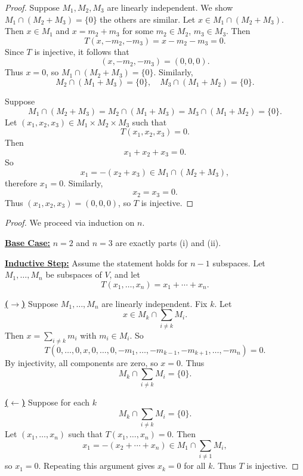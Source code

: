 \begin{proof}
\underbar{\textbf{($\longrightarrow$)}} 
    Suppose $M_1, M_2, M_3$ are linearly independent.
    We show $M_1 \cap (M_2 + M_3)=\{0\}$ the others are similar.
    Let $x \in M_1 \cap (M_2 + M_3)$. Then $x \in M_1$ and $x = m_2 + m_3$ for some $m_2 \in M_2$, $m_3 \in M_3$.
    Then
    \[
    T(x, -m_2, -m_3) = x - m_2 - m_3 = 0.
    \]
    Since $T$ is injective, it follows that
    \[
    (x, -m_2, -m_3) = (0,0,0).
    \]
    Thus $x=0$, so $M_1 \cap (M_2 + M_3)=\{0\}$.
    Similarly,
    \[
    M_2 \cap (M_1 + M_3)=\{0\}, \quad
    M_3 \cap (M_1 + M_2)=\{0\}.
    \]

    \underbar{\textbf{($\longleftarrow$)}} 
    Suppose
    \[
    M_1 \cap (M_2 + M_3)
    =
    M_2 \cap (M_1 + M_3)
    =
    M_3 \cap (M_1 + M_2)
    =
    \{0\}.
    \]
    Let $(x_1,x_2,x_3) \in M_1 \times M_2 \times M_3$ such that
    \[
    T(x_1,x_2,x_3)=0.
    \]
    Then
    \[
    x_1 + x_2 + x_3 = 0.
    \]
    So
    \[
    x_1 = -(x_2 + x_3) \in M_1 \cap (M_2 + M_3),
    \]
    therefore $x_1=0$.
    Similarly,
    \[
    x_2 = x_3=0.
    \]
    Thus $(x_1,x_2,x_3)=(0,0,0)$, so $T$ is injective.
\end{proof}


\begin{proof}
    We proceed via induction on $n$.

    \underline{\textbf{Base Case:}} $n=2$ and $n=3$ are exactly parts (i) and (ii).

    \underline{\textbf{Inductive Step:}} 
    Assume the statement holds for $n-1$ subspaces.
    Let $M_1,\ldots,M_n$ be subspaces of $V$, and let
    \[
    T(x_1,\ldots,x_n)=x_1+\cdots+x_n.
    \]

    \underline{\textbf{($\longrightarrow$)}} Suppose $M_1,\ldots,M_n$ are linearly independent.
    Fix $k$. Let
    \[
    x \in M_k \cap \sum_{i\neq k} M_i.
    \]
    Then $x = \sum_{i\neq k} m_i$ with $m_i \in M_i$. So
    \[
    T(0,\ldots,0,x,0,\ldots,0,-m_1,\ldots,-m_{k-1},-m_{k+1},\ldots,-m_n)=0.
    \]
    By injectivity, all components are zero, so $x=0$. Thus
    \[
    M_k \cap \sum_{i\neq k} M_i = \{0\}.
    \]

    \underline{\textbf{($\longleftarrow$)}} Suppose for each $k$
    \[
    M_k \cap \sum_{i\neq k} M_i = \{0\}.
    \]
    Let $(x_1,\ldots,x_n)$ such that $T(x_1,\ldots,x_n)=0$.
    Then
    \[
    x_1 = -(x_2+\cdots+x_n) \in M_1 \cap \sum_{i\neq 1} M_i,
    \]
    so $x_1=0$. Repeating this argument gives $x_k=0$ for all $k$.
    Thus $T$ is injective.
\end{proof}

